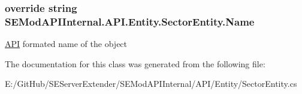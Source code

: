 \subsubsection[{Name}]{\setlength{\rightskip}{0pt plus 5cm}override string S\+E\+Mod\+A\+P\+I\+Internal.\+A\+P\+I.\+Entity.\+Sector\+Entity.\+Name\hspace{0.3cm}{\ttfamily [get]}}\label{class_s_e_mod_a_p_i_internal_1_1_a_p_i_1_1_entity_1_1_sector_entity_ae68a08460ef1de5f1219c9aac8ab081e}


\hyperlink{namespace_s_e_mod_a_p_i_internal_1_1_a_p_i}{A\+P\+I} formated name of the object 



The documentation for this class was generated from the following file\+:\begin{DoxyCompactItemize}
\item 
E\+:/\+Git\+Hub/\+S\+E\+Server\+Extender/\+S\+E\+Mod\+A\+P\+I\+Internal/\+A\+P\+I/\+Entity/Sector\+Entity.\+cs\end{DoxyCompactItemize}
